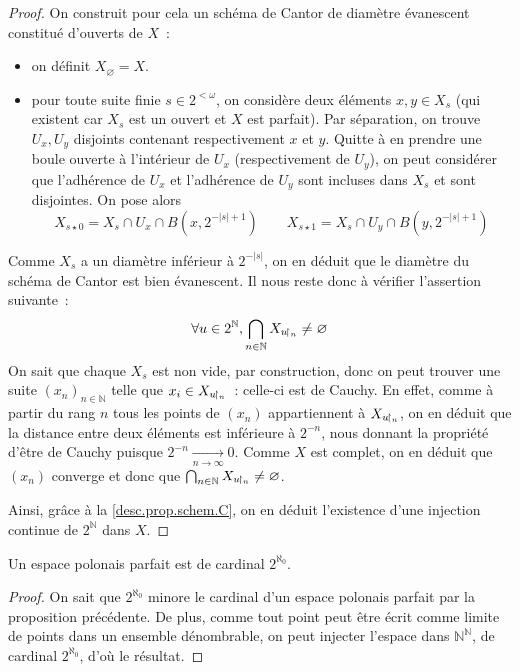 \begin{proof}
  On construit pour cela un schéma de Cantor de diamètre évanescent constitué
  d'ouverts de $X$~:
  \begin{itemize}
  \item on définit $X_\varnothing = X$.
  \item pour toute suite finie $s\in 2^{<\omega}$, on considère deux éléments
    $x,y\in X_s$ (qui existent car $X_s$ est un ouvert et $X$ est parfait). Par
    séparation, on trouve $U_x,U_y$ disjoints contenant respectivement $x$ et
    $y$. Quitte à en prendre une boule ouverte à l'intérieur de $U_x$
    (respectivement de $U_y$), on peut considérer que l'adhérence de
    $U_x$ et l'adhérence de $U_y$ sont incluses dans $X_s$ et sont disjointes.
    On pose alors
    \[X_{s\star 0} = X_s\cap U_x \cap B(x,2^{-|s|+1})\qquad
    X_{s\star 1} = X_s\cap U_y \cap B(y,2^{-|s|+1})\]
  \end{itemize}
  Comme $X_s$ a un diamètre inférieur à $2^{-|s|}$, on en déduit que le diamètre
  du schéma de Cantor est bien évanescent. Il nous reste donc à vérifier
  l'assertion suivante~:
  \[\forall u\in 2^\mathbb N,\bigcap_{n \in \mathbb N}X_{u\!\upharpoonright_{n}}
  \neq\varnothing\]
  On sait que chaque $X_s$ est non vide, par construction, donc on peut trouver
  une suite $(x_n)_{n\in\mathbb N}$ telle que $x_i\in X_{u\!\upharpoonright_{n}}$~: celle-ci
  est de Cauchy. En effet, comme à partir du rang $n$ tous les points de
  $(x_n)$ appartiennent à $X_{u\!\upharpoonright_{n}}$, on en déduit que la distance entre
  deux éléments est inférieure à $2^{-n}$, nous donnant la propriété d'être de
  Cauchy puisque $2^{-n} \xrightarrow[n\to\infty]{} 0$. Comme $X$ est complet,
  on en déduit que $(x_n)$ converge et donc que
  $\bigcap_{n\in\mathbb N} X_{u\!\upharpoonright_{n}}\neq\varnothing$.

  Ainsi, grâce à la \cref{desc.prop.schem.C}, on en déduit l'existence
  d'une injection continue de $2^\mathbb N$ dans $X$.
\end{proof}

\begin{corollary}
  Un espace polonais parfait est de cardinal $2^{\aleph_0}$.
\end{corollary}

\begin{proof}
  On sait que $2^{\aleph_0}$ minore le cardinal d'un espace polonais parfait par
  la proposition précédente. De plus, comme tout point peut être écrit comme
  limite de points dans un ensemble dénombrable, on peut injecter l'espace dans
  $\mathbb N^\mathbb N$, de cardinal $2^{\aleph_0}$, d'où le résultat.
\end{proof}

